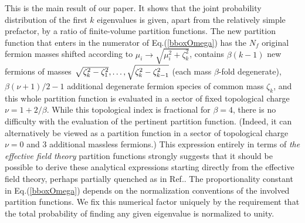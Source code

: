 \label{bboxOmega}
\eea
This is the main result of our paper. It shows that the joint probability
distribution of the first $k$ eigenvalues is given, apart from the
relatively simple prefactor, by a ratio of
finite-volume partition functions.
The new partition function that enters in the
numerator of Eq.(\ref{bboxOmega}) has the $N_f$
original fermion masses shifted according to $\mu_i \to
\sqrt{\mu_i^2+\zeta_k^2}$, contains $\beta(k-1)$ new fermions
of masses $\sqrt{\zeta_k^2-\zeta_1^2}, \ldots, \sqrt{\zeta_k^2-\zeta_{k-1}^2}$
(each mass $\beta$-fold degenerate), $\beta(\nu+1)/2-1$
additional degenerate fermion species of common mass $\zeta_k$,
and this whole partition function is evaluated in a sector of fixed
topological charge $\nu=1+2/\beta$. While this topological index
is fractional for $\beta=4$, there is no difficulty with the evaluation
of the pertinent partition function. (Indeed, it can alternatively
be viewed as a partition function in a sector of topological charge
$\nu=0$ and 3 additional massless fermions.) This expression
entirely in terms of {\em the effective field theory} partition
functions strongly suggests that it should
be possible to derive these analytical expressions starting directly
from the effective field theory, perhaps partially quenched as in
Ref.\cite{OTV}. The proportionality 
constant in Eq.(\ref{bboxOmega})
depends on the normalization conventions
of the involved partition functions. We fix this numerical factor
uniquely by the requirement that the total probability of finding any
given eigenvalue is normalized to unity.

